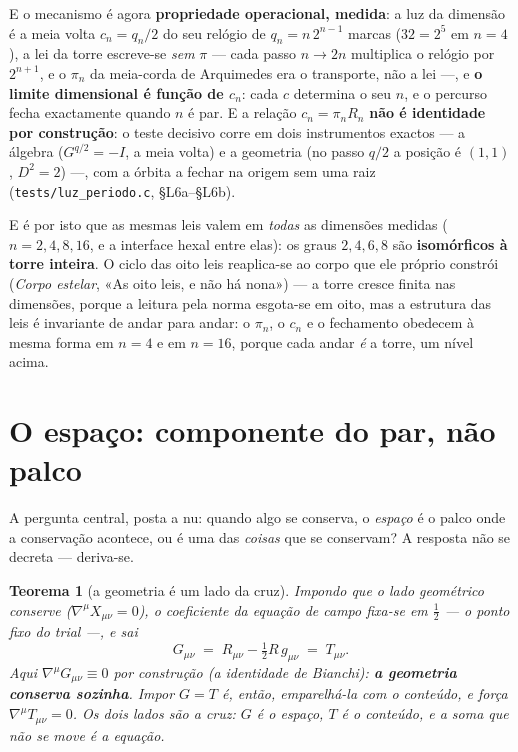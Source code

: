 \documentclass[11pt,a4paper]{article}
\newcommand{\code}[1]{\texttt{\small #1}}
\newtheorem{teorema}{Teorema}
\begin{document}
\smallskip
\noindent E o mecanismo é agora \textbf{propriedade operacional, medida}: a luz da dimensão é a
meia volta $c_n=q_n/2$ do seu relógio de $q_n=n\,2^{n-1}$ marcas ($32=2^5$ em $n=4$), a lei da
torre escreve-se \emph{sem} $\pi$ --- cada passo $n\to2n$ multiplica o relógio por $2^{n+1}$, e o
$\pi_n$ da meia-corda de Arquimedes era o transporte, não a lei ---, e \textbf{o limite dimensional
é função de $c_n$}: cada $c$ determina o seu $n$, e o percurso fecha exactamente quando $n$ é par.
E a relação $c_n=\pi_n R_n$ \textbf{não é identidade por construção}: o teste decisivo corre em dois
instrumentos exactos --- a álgebra ($G^{q/2}=-I$, a meia volta) e a geometria (no passo $q/2$ a
posição é $(1,1)$, $D^{2}=2$) ---, com a órbita a fechar na origem sem uma raiz
(\code{tests/luz\_periodo.c}, §L6a--§L6b).

\smallskip
\noindent E é por isto que as mesmas leis valem em \emph{todas} as dimensões medidas
($n=2,4,8,16$, e a interface hexal entre elas): os graus $2,4,6,8$ são
\textbf{isomórficos à torre inteira}. O ciclo das oito leis reaplica-se ao corpo que ele
próprio constrói (\emph{Corpo estelar}, «As oito leis, e não há nona») --- a torre cresce
finita nas dimensões, porque a leitura pela norma esgota-se em oito, mas a estrutura das
leis é invariante de andar para andar: o $\pi_n$, o $c_n$ e o fechamento obedecem à mesma
forma em $n=4$ e em $n=16$, porque cada andar \emph{é} a torre, um nível acima.

\section{O espaço: componente do par, não palco}\label{sec:espaco}

A pergunta central, posta a nu: quando algo se conserva, o \emph{espaço} é o palco onde a conservação
acontece, ou é uma das \emph{coisas} que se conservam? A resposta não se decreta --- deriva-se.

\begin{teorema}[a geometria é um lado da cruz]\label{thm:espaco}
Impondo que o lado geométrico conserve ($\nabla^{\mu}X_{\mu\nu}=0$), o coeficiente da equação de campo
fixa-se em $\tfrac12$ --- o ponto fixo do trial ---, e sai
\[
  G_{\mu\nu}\;=\;R_{\mu\nu}-\tfrac12R\,g_{\mu\nu}\;=\;T_{\mu\nu}.
\]
Aqui $\nabla^{\mu}G_{\mu\nu}\equiv0$ por construção (a identidade de Bianchi): \textbf{a geometria conserva
sozinha}. Impor $G=T$ é, então, \emph{emparelhá-la} com o conteúdo, e força $\nabla^{\mu}T_{\mu\nu}=0$. Os
dois lados são a cruz: $G$ é o espaço, $T$ é o conteúdo, e a soma que não se move é a equação.
\end{teorema}
\end{document}
